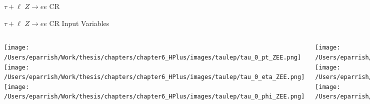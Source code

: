 \documentclass[aspectratio=169,xcolor=table]{beamer}
\begin{document}
    \begin{frame}[c]{$\tau+\ell$ $Z \rightarrow ee$ CR}
      \begin{table}
      \end{table}
    \end{frame}

    \begin{frame}[t]{$\tau+\ell$ $Z \rightarrow ee$ CR Input Variables}
      \begin{columns}[t]
          \texttt{[image: /Users/eparrish/Work/thesis/chapters/chapter6\_HPlus/images/taulep/tau\_0\_pt\_ZEE.png]}
          \texttt{[image: /Users/eparrish/Work/thesis/chapters/chapter6\_HPlus/images/taulep/tau\_0\_eta\_ZEE.png]}
          \texttt{[image: /Users/eparrish/Work/thesis/chapters/chapter6\_HPlus/images/taulep/tau\_0\_phi\_ZEE.png]}

          \texttt{[image: /Users/eparrish/Work/thesis/chapters/chapter6\_HPlus/images/taulep/met\_et\_ZEE.png]}
          \texttt{[image: /Users/eparrish/Work/thesis/chapters/chapter6\_HPlus/images/taulep/met\_phi\_ZEE.png]}
          \texttt{[image: /Users/eparrish/Work/thesis/chapters/chapter6\_HPlus/images/taulep/jet\_1\_pt\_ZEE.png]}

          \texttt{[image: /Users/eparrish/Work/thesis/chapters/chapter6\_HPlus/images/taulep/bjet\_0\_pt\_ZEE.png]}
          \texttt{[image: /Users/eparrish/Work/thesis/chapters/chapter6\_HPlus/images/taulep/bjet\_0\_eta\_ZEE.png]}
          \texttt{[image: /Users/eparrish/Work/thesis/chapters/chapter6\_HPlus/images/taulep/bjet\_0\_phi\_ZEE.png]}

          \texttt{[image: /Users/eparrish/Work/thesis/chapters/chapter6\_HPlus/images/taulep/tau\_0\_upsilon\_ZEE.png]}
          \texttt{[image: /Users/eparrish/Work/thesis/chapters/chapter6\_HPlus/images/taulep/tau\_0\_charged\_tracks\_0\_pt\_ZEE.png]}

      \end{columns}
    \end{frame}
\end{document}
